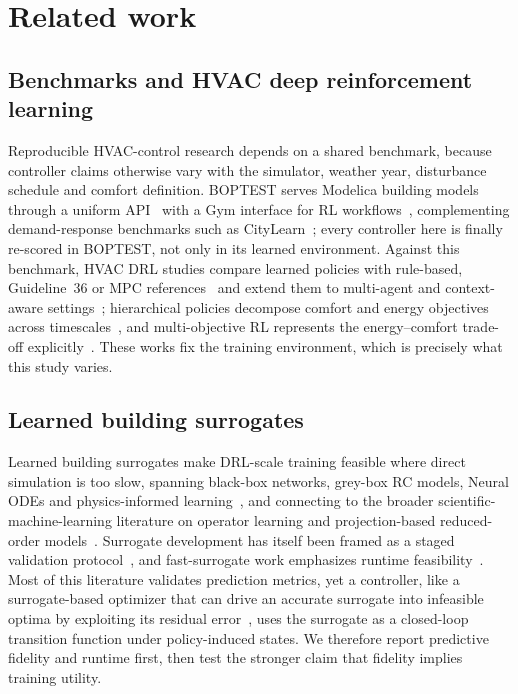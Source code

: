 \section{Related work}\label{sec:related}

\subsection{Benchmarks and HVAC deep reinforcement learning}
Reproducible HVAC-control research depends on a shared benchmark, because controller claims
otherwise vary with the simulator, weather year, disturbance schedule and comfort definition.
BOPTEST serves Modelica building models through a uniform
API~\cite{Blum2021BOPTEST,Wetter2014Modelica} with a Gym interface for RL
workflows~\cite{Arroyo2021GymBOPTEST}, complementing demand-response benchmarks such as
CityLearn~\cite{VazquezCanteli2019CityLearn,VazquezCanteli2019Review}; every controller here is
finally re-scored in BOPTEST, not only in its learned environment. Against this benchmark, HVAC DRL
studies compare learned policies with rule-based, Guideline~36 or MPC
references~\cite{Savino2025ASHRAE,Wang2025SafeDRL,Nguyen2024Modelling,Sun2024DirectTSup} and extend
them to multi-agent and context-aware
settings~\cite{Deng2025MultiAgent,Alotaibi2025ContextAware}; hierarchical policies decompose
comfort and energy objectives across timescales~\cite{Liao2025HDRL,Bacon2017Options,Nachum2018HIRO},
and multi-objective RL represents the energy--comfort trade-off
explicitly~\cite{Yang2019MORL,Roijers2013MOSurvey,Hayes2022MOSurvey,Byeon2025MaxMinMORL}. These
works fix the training environment, which is precisely what this study varies.

\subsection{Learned building surrogates}
Learned building surrogates make DRL-scale training feasible where direct simulation is too slow,
spanning black-box networks, grey-box RC models, Neural ODEs and physics-informed
learning~\cite{Bacher2011RCIdentification,Berthou2014RC,Bunning2020RC,Picard2017WhiteBox,Raissi2019PINN,Chen2018NeuralODE,Karpatne2017TheoryGuided,Willard2022PIML,Hedayat2025PINN},
and connecting to the broader scientific-machine-learning literature on operator learning and
projection-based reduced-order models~\cite{Lu2021DeepONet,Li2021FNO,Benner2015ROM}. Surrogate
development has itself been framed as a staged validation protocol~\cite{HouEvins2024}, and
fast-surrogate work emphasizes runtime feasibility~\cite{Mshragi2026FastML}. Most of this literature
validates prediction metrics, yet a controller, like a surrogate-based optimizer that can drive an
accurate surrogate into infeasible optima by exploiting its residual error~\cite{Jones1998EGO}, uses
the surrogate as a closed-loop transition function under policy-induced states. We therefore report
predictive fidelity and runtime first, then test the stronger claim that fidelity implies training
utility.

